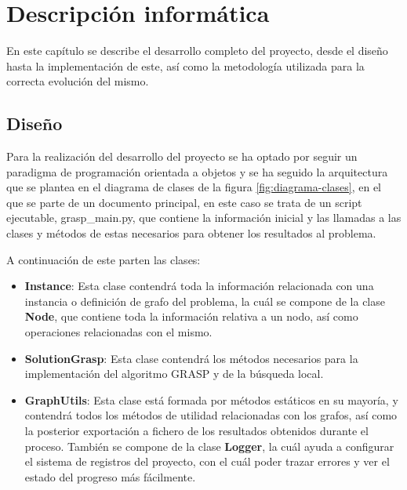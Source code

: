 
\chapter{Descripción informática} %

\label{Chapter4} %


En este capítulo se describe el desarrollo completo del proyecto, desde el diseño hasta la implementación de este, así como la metodología utilizada para la correcta evolución del mismo.

\section{Diseño}
Para la realización del desarrollo del proyecto se ha optado por seguir un paradigma de programación orientada a objetos y se ha seguido la arquitectura que se plantea en el diagrama de clases de la figura \ref{fig:diagrama-clases}, en el que se parte de un documento principal, en este caso se trata de un script ejecutable, grasp\_main.py, que contiene la información inicial y las llamadas a las clases y métodos de estas necesarios para obtener los resultados al problema.

A continuación de este parten las clases:
 \begin{itemize}
	\item \textbf{Instance}: Esta clase contendrá toda la información relacionada con una instancia o definición de grafo del problema, la cuál se compone de la clase \textbf{Node}, que contiene toda la información relativa a un nodo, así como operaciones relacionadas con el mismo.
	\item \textbf{SolutionGrasp}: Esta clase contendrá los métodos necesarios para la implementación del algoritmo \gls{GRASP} y de la búsqueda local.
	\item \textbf{GraphUtils}: Esta clase está formada por métodos estáticos en su mayoría, y contendrá todos los métodos de utilidad relacionadas con los grafos, así como la posterior exportación a fichero de los resultados obtenidos durante el proceso. También se compone de la clase \textbf{Logger}, la cuál ayuda a configurar el sistema de registros del proyecto, con el cuál poder trazar errores y ver el estado del progreso más fácilmente.
\end{itemize}

